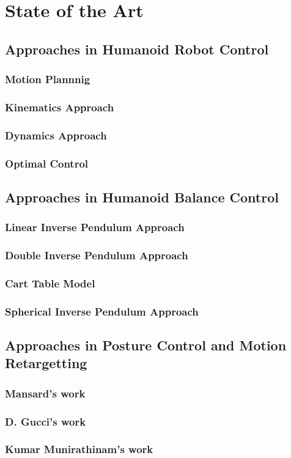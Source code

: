 \chapter{State of the Art}


\section{Approaches in Humanoid Robot Control}
\subsection{Motion Plannnig}
\subsection{Kinematics Approach}
\subsection{Dynamics Approach}
\subsection{Optimal Control}

\section{Approaches in Humanoid Balance Control}
\subsection{Linear Inverse Pendulum Approach}
\subsection{Double Inverse Pendulum Approach}
\subsection{Cart Table Model}
\subsection{Spherical Inverse Pendulum Approach}

\section{Approaches in Posture Control and Motion Retargetting}
\subsection{Mansard's work}
\subsection{D. Gucci's work}
\subsection{Kumar Munirathinam's work}

